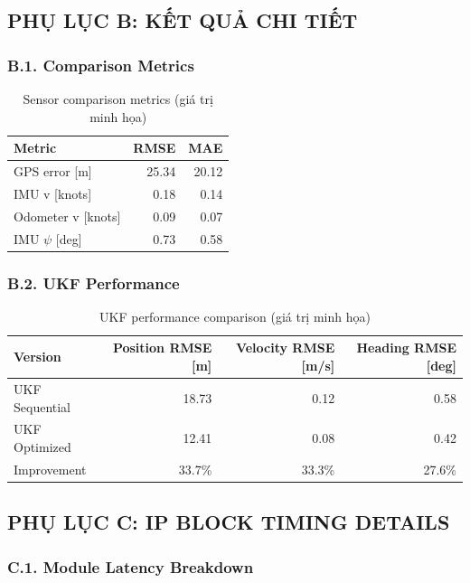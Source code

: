 \subsection*{PHỤ LỤC B: KẾT QUẢ CHI TIẾT}

\subsubsection*{B.1. Comparison Metrics}

\begin{table}[H]
\centering
\begin{tabular}{|l|r|r|}
\hline
\textbf{Metric} & \textbf{RMSE} & \textbf{MAE} \\
\hline
GPS error [m] & 25.34 & 20.12 \\
\hline
IMU v [knots] & 0.18 & 0.14 \\
\hline
Odometer v [knots] & 0.09 & 0.07 \\
\hline
IMU $\psi$ [deg] & 0.73 & 0.58 \\
\hline
\end{tabular}
\caption{Sensor comparison metrics (giá trị minh họa)}
\end{table}

\subsubsection*{B.2. UKF Performance}

\begin{table}[H]
\centering
\begin{tabular}{|l|r|r|r|}
\hline
\textbf{Version} & \textbf{Position RMSE [m]} & \textbf{Velocity RMSE [m/s]} & \textbf{Heading RMSE [deg]} \\
\hline
UKF Sequential & 18.73 & 0.12 & 0.58 \\
\hline
UKF Optimized & 12.41 & 0.08 & 0.42 \\
\hline
Improvement & 33.7\% & 33.3\% & 27.6\% \\
\hline
\end{tabular}
\caption{UKF performance comparison (giá trị minh họa)}
\end{table}

\subsection*{PHỤ LỤC C: IP BLOCK TIMING DETAILS}

\subsubsection*{C.1. Module Latency Breakdown}

